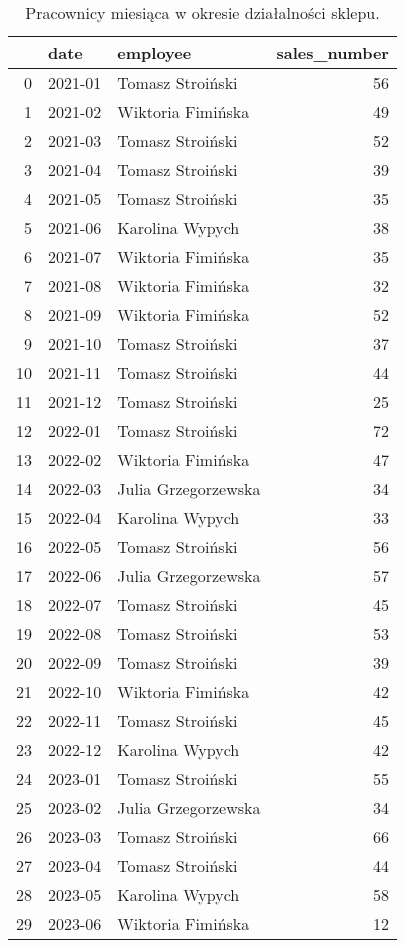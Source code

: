 \begin{table}[h]
\centering
\caption{Pracownicy miesiąca w okresie działalności sklepu.}\label{tab:tab1}
\begin{tabular}{rllr}
\hline
    & date    & employee            &   sales\_number \\
\hline
  0 & 2021-01 & Tomasz Stroiński    &             56 \\
  1 & 2021-02 & Wiktoria Fimińska   &             49 \\
  2 & 2021-03 & Tomasz Stroiński    &             52 \\
  3 & 2021-04 & Tomasz Stroiński    &             39 \\
  4 & 2021-05 & Tomasz Stroiński    &             35 \\
  5 & 2021-06 & Karolina Wypych     &             38 \\
  6 & 2021-07 & Wiktoria Fimińska   &             35 \\
  7 & 2021-08 & Wiktoria Fimińska   &             32 \\
  8 & 2021-09 & Wiktoria Fimińska   &             52 \\
  9 & 2021-10 & Tomasz Stroiński    &             37 \\
 10 & 2021-11 & Tomasz Stroiński    &             44 \\
 11 & 2021-12 & Tomasz Stroiński    &             25 \\
 12 & 2022-01 & Tomasz Stroiński    &             72 \\
 13 & 2022-02 & Wiktoria Fimińska   &             47 \\
 14 & 2022-03 & Julia Grzegorzewska &             34 \\
 15 & 2022-04 & Karolina Wypych     &             33 \\
 16 & 2022-05 & Tomasz Stroiński    &             56 \\
 17 & 2022-06 & Julia Grzegorzewska &             57 \\
 18 & 2022-07 & Tomasz Stroiński    &             45 \\
 19 & 2022-08 & Tomasz Stroiński    &             53 \\
 20 & 2022-09 & Tomasz Stroiński    &             39 \\
 21 & 2022-10 & Wiktoria Fimińska   &             42 \\
 22 & 2022-11 & Tomasz Stroiński    &             45 \\
 23 & 2022-12 & Karolina Wypych     &             42 \\
 24 & 2023-01 & Tomasz Stroiński    &             55 \\
 25 & 2023-02 & Julia Grzegorzewska &             34 \\
 26 & 2023-03 & Tomasz Stroiński    &             66 \\
 27 & 2023-04 & Tomasz Stroiński    &             44 \\
 28 & 2023-05 & Karolina Wypych     &             58 \\
 29 & 2023-06 & Wiktoria Fimińska   &             12 \\
\hline
\end{tabular}\end{table}